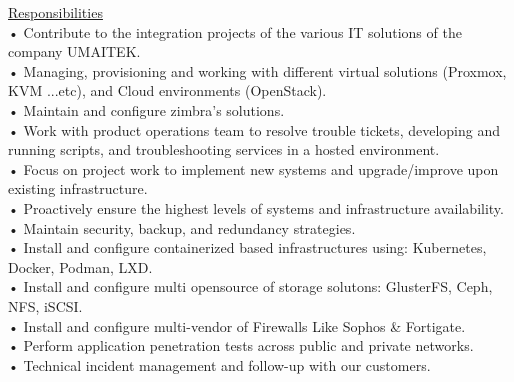 \documentclass{cv}
\begin{document}
{
    \underline {Responsibilities}\\

    • Contribute to the integration projects of the various IT solutions of the company UMAITEK.\\
    • Managing, provisioning and working with different virtual solutions (Proxmox, KVM ...etc), and Cloud environments (OpenStack). \\
    • Maintain and configure zimbra's solutions.\\
    • Work with product operations team to resolve trouble tickets, developing and running scripts, and troubleshooting services in a hosted environment.\\
    • Focus on project work to implement new systems and upgrade/improve upon existing infrastructure.\\
    • Proactively ensure the highest levels of systems and infrastructure availability.\\
    • Maintain security, backup, and redundancy strategies.\\
    • Install and configure containerized based infrastructures using: Kubernetes, Docker, Podman, LXD.\\
    • Install and configure multi opensource of storage solutons: GlusterFS, Ceph, NFS, iSCSI.\\
    • Install and configure multi-vendor of Firewalls Like Sophos \& Fortigate.\\
    • Perform application penetration tests across public and private networks.\\
    • Technical incident management and follow-up with our customers.\\


}
\end{document}
